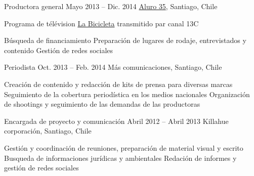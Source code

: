 \begin{joblist}
    
    
\item[Productora general]{Mayo 2013 -- Dic. 2014}
     {     
     \href{https://www.aluro35.com/}  {Aluro 35}, Santiago, Chile
     }
     {Programa de télévision \href{http://www.13.cl/c/programas/la-bicicleta}{La Bicicleta} transmitido par canal 13C \\
		\normalsize{
		\iftbftiny \vspace{-0.5cm} \fi
			\begin{itemize}
			  \iftbftiny \setlength\itemsep{-3pt} \fi
			  \cvitem[\checkmark] Búsqueda de financiamiento                
			  \cvitem[\checkmark] Preparación de lugares de rodaje, entrevistados y contenido
			  \cvitem[\checkmark] Gestión de redes sociales      
			\end{itemize}     
        }
	}



\item[Periodista]{Oct. 2013 -- Feb. 2014 }     
  	{
  	Más comunicaciones, Santiago, Chile
  	}     
  	{
		\normalsize{
		\iftbftiny \vspace{-0.5cm} \fi
		\begin{itemize}
			  \iftbftiny \setlength\itemsep{-3pt} \fi
			  \cvitem[\checkmark]  Creación de contenido y redacción de kits de prensa para diversas marcas                                       
			  \cvitem[\checkmark]  Seguimiento de la cobertura periodística en los medios nacionales                                          
			  \cvitem[\checkmark]  Organización de shootings y seguimiento de las demandas de las productoras

		\end{itemize}       
        }
	}

\item[Encargada de proyecto y comunicación]{Abril 2012 -- Abril 2013 \vspace{0.2cm}}     
  	{
  	Killahue corporación, Santiago, Chile
  	}     
  	{
       
        \normalsize{
		\iftbftiny \vspace{-0.5cm} \fi
		\begin{itemize}
			  \iftbftiny \setlength\itemsep{-3pt} \fi
			  \cvitem[\checkmark] Gestión y coordinación de reuniones, preparación de material visual y escrito                                   
			  \cvitem[\checkmark] Busqueda de informaciones jurídicas y ambientales
			  \cvitem[\checkmark] Redación de informes y gestión de redes sociales                                       
		\end{itemize}  
		}
	}


   

\end{joblist}


